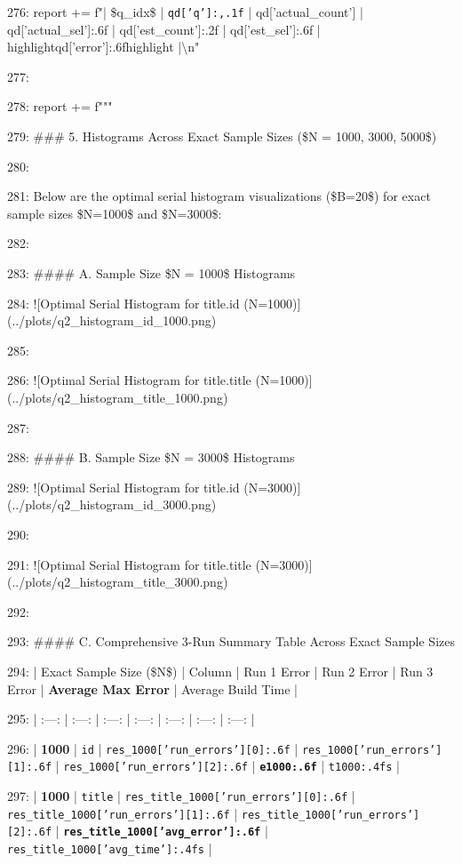 \documentclass[11pt,a4paper]{article}
\begin{document}
276:         report += f"| \$q\_{{{idx}}}\$ | \texttt{{qd['q']:,.1f}} | {qd['actual\_count']} | {qd['actual\_sel']:.6f} | {qd['est\_count']:.2f} | {qd['est\_sel']:.6f} | {highlight}{qd['error']:.6f}{highlight} |\textbackslash{}n"

277:

278:     report += f"""

279: \#\#\# 5. Histograms Across Exact Sample Sizes (\$N = 1000, 3000, 5000\$)

280:

281: Below are the optimal serial histogram visualizations (\$B=20\$) for exact sample sizes \$N=1000\$ and \$N=3000\$:

282:

283: \#\#\#\# A. Sample Size \$N = 1000\$ Histograms

284: ![Optimal Serial Histogram for title.id (N=1000)](../plots/q2\_histogram\_id\_1000.png)

285:

286: ![Optimal Serial Histogram for title.title (N=1000)](../plots/q2\_histogram\_title\_1000.png)

287:

288: \#\#\#\# B. Sample Size \$N = 3000\$ Histograms

289: ![Optimal Serial Histogram for title.id (N=3000)](../plots/q2\_histogram\_id\_3000.png)

290:

291: ![Optimal Serial Histogram for title.title (N=3000)](../plots/q2\_histogram\_title\_3000.png)

292:

293: \#\#\#\# C. Comprehensive 3-Run Summary Table Across Exact Sample Sizes

294: | Exact Sample Size (\$N\$) | Column | Run 1 Error | Run 2 Error | Run 3 Error | \textbf{Average Max Error} | Average Build Time |

295: | :---: | :---: | :---: | :---: | :---: | :---: | :---: |

296: | \textbf{1000} | \texttt{id} | \texttt{{res\_1000['run\_errors'][0]:.6f}} | \texttt{{res\_1000['run\_errors'][1]:.6f}} | \texttt{{res\_1000['run\_errors'][2]:.6f}} | \textbf{\texttt{{e1000:.6f}}} | \texttt{{t1000:.4f}s} |

297: | \textbf{1000} | \texttt{title} | \texttt{{res\_title\_1000['run\_errors'][0]:.6f}} | \texttt{{res\_title\_1000['run\_errors'][1]:.6f}} | \texttt{{res\_title\_1000['run\_errors'][2]:.6f}} | \textbf{\texttt{{res\_title\_1000['avg\_error']:.6f}}} | \texttt{{res\_title\_1000['avg\_time']:.4f}s} |
\end{document}
